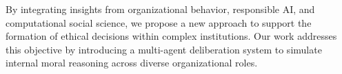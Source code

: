 By integrating insights from organizational behavior, responsible AI, and computational social science, we propose a new approach to support the formation of ethical decisions within complex institutions. Our work addresses this objective by introducing a multi-agent deliberation system to simulate internal moral reasoning across diverse organizational roles.
